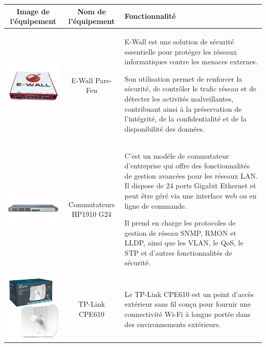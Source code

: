 \begin{table}[H]
\begin{center}
\begin{tabular}{|c{3cm}|c{3cm}|l{10cm}|}
\hline
\textbf{Image de l'équipement}         & \textbf{Nom de l'équipement}   & \textbf{Fonctionnalité} \\
\hline
\includegraphics[width=3cm]{Images/ewall.png} & E-Wall Pare-Feu & E-Wall est une solution de sécurité essentielle pour protéger les réseaux informatiques contre les menaces externes. 

Son utilisation permet de renforcer la sécurité, de contrôler le trafic réseau et de détecter les activités malveillantes, contribuant ainsi à la préservation de l'intégrité, de la confidentialité et de la disponibilité des données. \\
\hline
\includegraphics[width=3cm]{Images/HP1910.png} & Commutateurs HP1910 G24 & C'est un modèle de commutateur d'entreprise qui offre des fonctionnalités de gestion avancées pour les réseaux LAN. Il dispose de 24 ports Gigabit Ethernet et peut être géré via une interface web ou en ligne de commande. 

Il prend en charge les protocoles de gestion de réseau SNMP, RMON et LLDP, ainsi que les VLAN, le QoS, le STP et d'autres fonctionnalités de sécurité.  \\
\hline
\includegraphics[width=3cm]{Images/TP-Link-CPE610-5GHz_1.png} & TP-Link CPE610 & Le TP-Link CPE610 est un point d'accès extérieur sans fil conçu pour fournir une connectivité Wi-Fi à longue portée dans des environnements extérieurs. 


\end{tabular}
\end{center}
\end{table}
